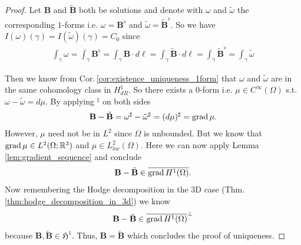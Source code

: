 \documentclass[../master_thesis.tex]{subfiles}
\begin{document}
\begin{proof}
    Let $\mathbf{B}$ and $\tilde{\mathbf{B}}$ both be solutions and denote with $\omega$ 
    and $\tilde{\omega}$ the corresponding $1$-forms i.e. $\omega =
    \mathbf{B}^\flat$ and $\tilde{\omega} = \tilde{\mathbf{B}}^\flat$. 
    So we have $I(\omega)(\gamma) = I(\tilde{\omega})(\gamma) = C_0$
    since 
    \begin{align*}
        \int_\gamma \omega = \int_\gamma \mathbf{B}^\flat = 
        \int_\gamma \mathbf{B} \cdot d\ell = \int_\gamma \tilde{\mathbf{B}}\cdot d\ell 
        = \int_\gamma \tilde{\mathbf{B}}^\flat = \int_\gamma \tilde{\omega}
    \end{align*}

    Then we know from Cor.\,\ref{cor:existence_uniqueness_1form} 
    that $\omega$ and $\tilde{\omega}$ are in the 
    same cohomology class in $H^1_{dR}$. So there exists a $0$-form i.e. 
    $\mu \in C^\infty(\Omega)$ s.t. $\omega - \tilde{\omega} = d\mu$.
    By applying $^\sharp$ on both sides
    \begin{align*}
        \mathbf{B} - \tilde{\mathbf{B}} 
        = \omega^\sharp - \tilde{\omega}^\sharp
        = (d\mu)^\sharp = \operatorname{grad} \mu.
    \end{align*}
    However, $\mu$ need not be in $L^2$ since $\Omega$ is unbounded.
    But we know that $\operatorname{grad} \mu \in L^2(\Omega;\mathbb{R}^3)$ and 
    $\mu \in L^2_{loc}(\Omega)$. 
    Here we can now apply Lemma \ref{lem:gradient_sequence} and conclude
    \begin{align*}
        \mathbf{B} - \tilde{\mathbf{B}} \in \overline{\operatorname{grad} H^1(\Omega)}.
    \end{align*}
    Now remembering the Hodge decomposition in the 3D case (Thm.\,\ref{thm:hodge_decomposition_in_3d}) we know 
    \begin{align*}
        \mathbf{B} - \tilde{\mathbf{B}} \in \overline{\operatorname{grad} H^1(\Omega)}^\perp
    \end{align*}
    because $\mathbf{B}, \tilde{\mathbf{B}} \in \mathfrak{H}^1$.
    Thus, $\mathbf{B} = \tilde{\mathbf{B}}$ which concludes the proof of uniqueness.
\end{proof}
\end{document}
